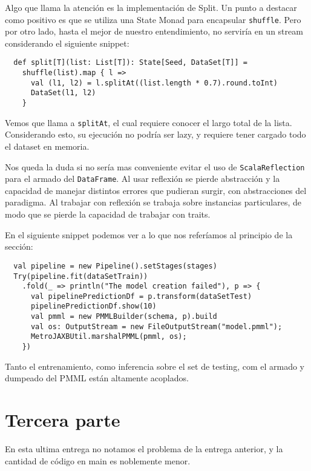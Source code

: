 \documentclass{article}
\begin{document}
Algo que llama la atención es la implementación de Split. Un punto a destacar como positivo es que se utiliza una State Monad para encapsular \texttt{shuffle}. Pero por otro lado, hasta el mejor de nuestro entendimiento, no serviría en un stream considerando el siguiente snippet:

\begin{verbatim}
  def split[T](list: List[T]): State[Seed, DataSet[T]] =
    shuffle(list).map { l =>
      val (l1, l2) = l.splitAt((list.length * 0.7).round.toInt)
      DataSet(l1, l2)
    }
\end{verbatim}

Vemos que llama a \texttt{splitAt}, el cual requiere conocer el largo total de la lista. Considerando esto, su ejecución no podría ser lazy, y requiere tener cargado todo el dataset en memoria.

Nos queda la duda si no sería mas conveniente evitar el uso de \texttt{ScalaReflection} para el armado del \texttt{DataFrame}. Al usar reflexión se pierde abstracción y la capacidad de manejar distintos errores que pudieran surgir, con abstracciones del paradigma. Al trabajar con reflexión se trabaja sobre instancias particulares, de modo que se pierde la capacidad de trabajar con traits.

En el siguiente snippet podemos ver a lo que nos referíamos al principio de la sección:

\begin{verbatim}
  val pipeline = new Pipeline().setStages(stages)
  Try(pipeline.fit(dataSetTrain))
    .fold(_ => println("The model creation failed"), p => {
      val pipelinePredictionDf = p.transform(dataSetTest)
      pipelinePredictionDf.show(10)
      val pmml = new PMMLBuilder(schema, p).build
      val os: OutputStream = new FileOutputStream("model.pmml");
      MetroJAXBUtil.marshalPMML(pmml, os);
    })
\end{verbatim}

Tanto el entrenamiento, como inferencia sobre el set de testing, com el armado y dumpeado del PMML están altamente acoplados.

\section{Tercera parte}
En esta ultima entrega no notamos el problema de la entrega anterior, y la cantidad de código en main es noblemente menor.
\end{document}
